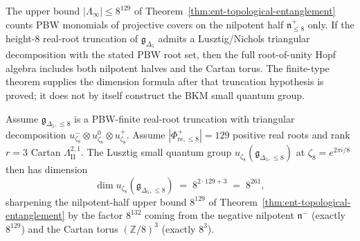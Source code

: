 The upper bound $|\Lambda_\infty| \le 8^{129}$ of
Theorem~\ref{thm:ent-topological-entanglement} counts PBW monomials
of projective covers on the nilpotent half $\mathfrak n^+_{\le 8}$
only. If the height-$8$ real-root truncation of
$\mathfrak g_{\Delta_5}$ admits a Lusztig/Nichols triangular
decomposition with the stated PBW root set, then the full
root-of-unity Hopf algebra includes both nilpotent halves and the
Cartan torus. The finite-type theorem supplies the dimension formula
after that truncation hypothesis is proved; it does not by itself
construct the BKM small quantum group.

\begin{theorem}
\label{thm:exact-pbw-u-zeta-8-truncation}
%
%
Assume $\mathfrak g_{\Delta_5,\le8}$ is a PBW-finite real-root
truncation with triangular decomposition
$u_{\zeta_8}^-\otimes u_{\zeta_8}^0\otimes u_{\zeta_8}^+$. Assume
$|\Phi^+_{\mathrm{re}, \le 8}| = 129$ positive real roots and rank
$r = 3$ Cartan $\Lambda^{2, 1}_{\mathrm{II}}$. The Lusztig small
quantum group $u_{\zeta_8}(\mathfrak g_{\Delta_5, \le 8})$ at
$\zeta_8 = e^{2\pi i/8}$ then has dimension
\begin{equation}\label{eq:exact-pbw-u-zeta-8-dim}
 \dim u_{\zeta_8}(\mathfrak g_{\Delta_5, \le 8})
 \;=\;
 8^{2\cdot 129 + 3}
 \;=\;
 8^{261},
\end{equation}
sharpening the nilpotent-half upper bound $8^{129}$ of
Theorem~\ref{thm:ent-topological-entanglement} by the factor
$8^{132}$ coming from the negative nilpotent $\mathfrak n^-$
(exactly $8^{129}$) and the Cartan torus $(\mathbb Z/8)^3$
(exactly $8^3$).
\end{theorem}

